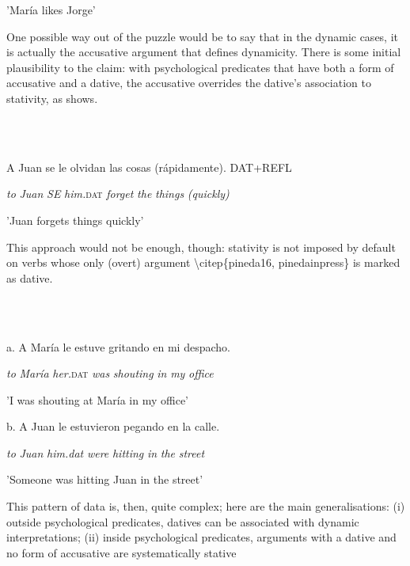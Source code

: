 \documentclass[output=paper,modfonts,nonflat]{langsci/langscibook}
\begin{document}
    {}'María likes Jorge'

One possible way out of the puzzle would be to say that in the dynamic cases, it is actually the accusative argument that defines dynamicity. There is some initial plausibility to the claim: with psychological predicates that have both a form of accusative and a dative, the accusative overrides the dative's association to stativity, as  shows. 

\ea%
    \label{ex:key:11}
    \gll\\
        \\
    \glt
    \z

          A Juan  se   le       olvidan las cosas (rápidamente).      DAT+REFL

    \textit{to} \textit{Juan} \textit{SE} \textit{him.}\textsc{dat}   \textit{forget}   \textit{the} \textit{things} \textit{(quickly)}

    {}'Juan forgets things quickly'

This approach would not be enough, though: stativity is not imposed by default on verbs whose only (overt) argument {\textbackslash}citep\{pineda16, pinedainpress\} is marked as dative.

\ea%
    \label{ex:key:12}
    \gll\\
        \\
    \glt
    \z

          a.   A María le       estuve   gritando en mi despacho.

          \textit{to} \textit{María} \textit{her.}\textsc{dat}   \textit{was}      \textit{shouting} \textit{in} \textit{my} \textit{office}

    {}'I was shouting at María in my office'

    b.   A Juan le       estuvieron   pegando en la calle.

          \textit{to} \textit{Juan} \textit{him.dat}   \textit{were}          \textit{hitting}    \textit{in} \textit{the} \textit{street}

    {}'Someone was hitting Juan in the street'

This pattern of data is, then, quite complex; here are the main generalisations: (i) outside psychological predicates, datives can be associated with dynamic interpretations; (ii) inside psychological predicates, arguments with a dative and no form of accusative are systematically stative
\end{document}
